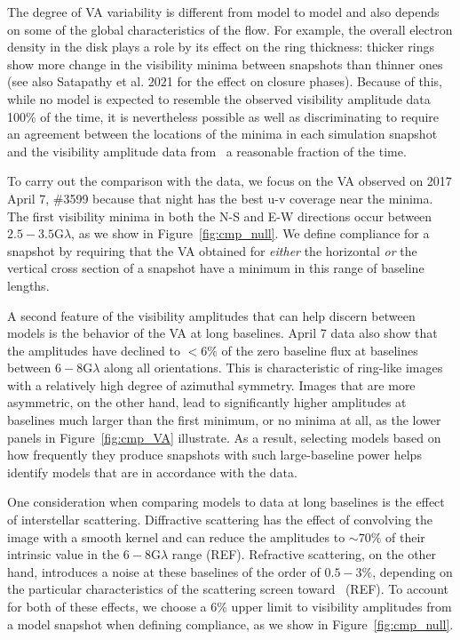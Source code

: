 The degree of VA variability is different from model to model and also
depends on some of the global characteristics of the flow.
For example, the overall electron density in the disk plays a role by
its effect on the ring thickness: thicker rings show more change in
the visibility minima between snapshots than thinner ones (see also
Satapathy et al. 2021 for the effect on closure phases).
Because of this, while no model is expected to resemble the observed
visibility amplitude data 100\% of the time, it is nevertheless
possible as well as discriminating to require an agreement between the
locations of the minima in each simulation snapshot and the visibility
amplitude data from \sgra\ a reasonable fraction of the time.

To carry out the comparison with the data, we focus on the VA observed
on 2017 April 7, \#3599 because that night has the best u-v coverage
near the minima.
The first visibility minima in both the N-S and E-W directions occur
between $2.5-3.5$\;G$\lambda$, as we show in
Figure~\ref{fig:cmp_null}.
We define compliance for a snapshot by requiring that the VA obtained
for {\it either} the horizontal {\it or} the vertical cross section of
a snapshot have a minimum in this range of baseline lengths.

A second feature of the visibility amplitudes that can help discern
between models is the behavior of the VA at long baselines.
April 7 data also show that the amplitudes have declined to $<6\%$ of
the zero baseline flux at baselines between $6-8$\;G$\lambda$ along
all orientations.
This is characteristic of ring-like images with a relatively high
degree of azimuthal symmetry.
Images that are more asymmetric, on the other hand, lead to
significantly higher amplitudes at baselines much larger than the
first minimum, or no minima at all, as the lower panels in
Figure~\ref{fig:cmp_VA} illustrate.
As a result, selecting models based on how frequently they produce
snapshots with such large-baseline power helps identify models that
are in accordance with the data.

One consideration when comparing models to data at long baselines is
the effect of interstellar scattering.
Diffractive scattering has the effect of convolving the image with a
smooth kernel and can reduce the amplitudes to $\sim 70\%$ of their
intrinsic value in the $6-8$\;G$\lambda$ range (REF).
Refractive scattering, on the other hand, introduces a noise at these
baselines of the order of $0.5-3\%$, depending on the particular
characteristics of the scattering screen toward \sgra\ (REF).
To account for both of these effects, we choose a $6\%$ upper limit to
visibility amplitudes from a model snapshot when defining compliance,
as we show in Figure~\ref{fig:cmp_null}.

